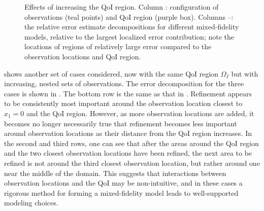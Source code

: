 \documentclass[review,sort&compress]{elsarticle}
\begin{document}
\begin{figure}[htbp]
{  \label{subfig:obsMFlast}
}
  \caption{Effects of increasing the QoI region. Column \protect{}: configuration of observations (teal points) and QoI region (purple box). Columns \protect{}--\protect{}: the relative error estimate decompositions for different mixed-fidelity models, relative to the largest localized error contribution; note the locations of regions of relatively large error compared to the observation locations and QoI region.}
  \label{fig:qoiStudy}
\end{figure}

 shows another set of cases considered, now with the same QoI region $\Omega_I$ but with increasing, nested sets of observations.
The error decomposition for the three cases is shown in . The bottom row is the same as that in . Refinement appears to be consistently most important around the observation location closest to $x_1=0$ and the QoI region. However, as more observation locations are added, it becomes no longer necessarily true that refinement becomes less important around observation locations as their distance from the QoI region increases. In the second and third rows, one can see that after the areas around the QoI region and the two closest observation locations have been refined, the next area to be refined is not around the third closest observation location, but rather around one near the middle of the domain. This suggests that interactions between observation locations and the QoI may be non-intuitive, and in these cases a rigorous method for forming a mixed-fidelity model leads to well-supported modeling choices.
\end{document}
